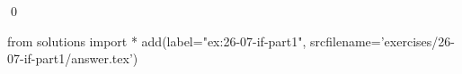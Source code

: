 
\begin{ex}
  \label{ex:26-07-if-part1}
  
  \qed
\end{ex}
\begin{python0}
from solutions import *
add(label="ex:26-07-if-part1",
    srcfilename='exercises/26-07-if-part1/answer.tex')
\end{python0}
